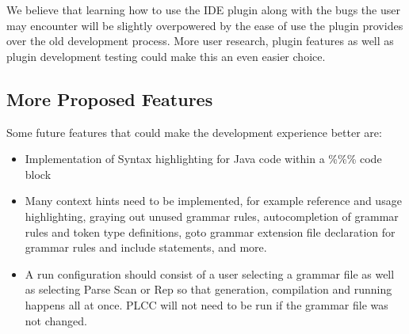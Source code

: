 \documentclass[conference, letterpaper]{IEEEtran}
\begin{document}
We believe that learning how to use the IDE plugin along with the bugs the user may encounter will be slightly overpowered by the ease of use the plugin provides over the old development process.
More user research, plugin features as well as plugin development testing could make this an even easier choice.

\subsection{More Proposed Features}\label{subsec:more-proposed-features}

Some future features that could make the development experience better are:
\begin{itemize}
    \item Implementation of Syntax highlighting for Java code within a \%\%\% code block
    \item Many context hints need to be implemented, for example reference and usage highlighting, graying out unused grammar rules, autocompletion of grammar rules and token type definitions, goto grammar extension file declaration for grammar rules and include statements, and more.
    \item A run configuration should consist of a user selecting a grammar file as well as selecting Parse Scan or Rep so that generation, compilation and running happens all at once.
    PLCC will not need to be run if the grammar file was not changed.
\end{itemize}

%
%

%
\end{document}
